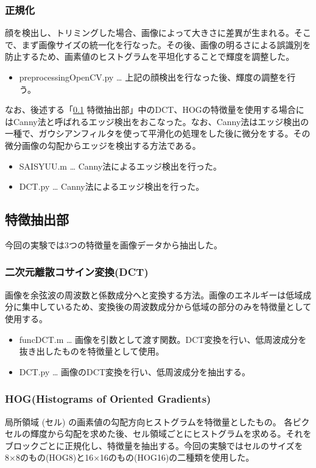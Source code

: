 \documentclass[10.5pt,a4j]{jarticle}
\begin{document}
	\subsubsection{正規化}
	顔を検出し、トリミングした場合、画像によって大きさに差異が生まれる。そこで、まず画像サイズの統一化を行なった。その後、画像の明るさによる誤識別を防止するため、画素値のヒストグラムを平坦化することで輝度を調整した。
	\begin{itemize}
		\item preprocessingOpenCV.py … 上記の顔検出を行なった後、輝度の調整を行う。
	\end{itemize}

	なお、後述する「\ref{feature} 特徴抽出部」中のDCT、HOGの特徴量を使用する場合にはCanny法と呼ばれるエッジ検出をおこなった。なお、Canny法はエッジ検出の一種で、ガウシアンフィルタを使って平滑化の処理をした後に微分をする。その微分画像の勾配からエッジを検出する方法である。

	\begin{itemize}
		\item SAISYUU.m … Canny法によるエッジ検出を行った。
		\item DCT.py … Canny法によるエッジ検出を行った。
	\end{itemize}
	\subsection{特徴抽出部}\label{feature}
	今回の実験では3つの特徴量を画像データから抽出した。
	\subsubsection{二次元離散コサイン変換(DCT)}
	画像を余弦波の周波数と係数成分へと変換する方法。画像のエネルギーは低域成分に集中しているため、変換後の周波数成分から低域の部分のみを特徴量として使用する。

	\begin{itemize}
		\item funcDCT.m … 画像を引数として渡す関数。DCT変換を行い、低周波成分を抜き出したものを特徴量として使用。
		\item DCT.py … 画像のDCT変換を行い、低周波成分を抽出する。
	\end{itemize}
	\subsubsection{HOG(Histograms of Oriented Gradients)}
	局所領域 (セル) の画素値の勾配方向ヒストグラムを特徴量としたもの。
	各ピクセルの輝度から勾配を求めた後、セル領域ごとにヒストグラムを求める。それをブロックごとに正規化し、特徴量を抽出する。今回の実験ではセルのサイズを8×8のもの(HOG8)と16×16のもの(HOG16)の二種類を使用した。
\end{document}
